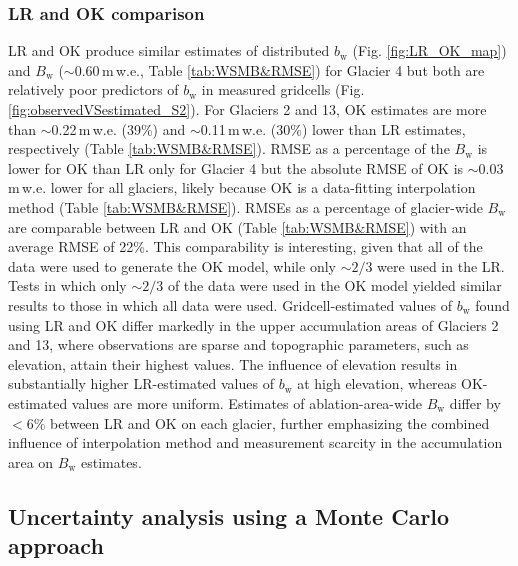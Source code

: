 \documentclass[review,oneside, letterpaper]{igs}
\begin{document}
\subsubsection{LR and OK comparison}
 
LR and OK produce similar estimates of distributed $b_\mathrm{w}$ (Fig. \ref{fig:LR_OK_map}) and $B_\mathrm{w}$ ($\sim$0.60\,m\,w.e., Table \ref{tab:WSMB&RMSE}) for Glacier 4 but both are relatively poor predictors of $b_\mathrm{w}$ in measured gridcells (Fig. \ref{fig:observedVSestimated_S2}). For Glaciers 2 and 13, OK estimates are more than $\sim$0.22\,m\,w.e. (39\%) and $\sim$0.11\,m\,w.e. (30\%) lower than LR estimates, respectively (Table \ref{tab:WSMB&RMSE}). RMSE as a percentage of the $B_\mathrm{w}$ is lower for OK than LR only for Glacier 4 but the absolute RMSE of OK is $\sim$0.03\,m\,w.e. lower for all glaciers, likely because OK is a data-fitting interpolation method (Table \ref{tab:WSMB&RMSE}). RMSEs as a percentage of  glacier-wide $B_\mathrm{w}$ are comparable between LR and OK (Table \ref{tab:WSMB&RMSE}) with an average RMSE of 22\%. This comparability is interesting, given that all of the data were used to generate the OK model, while only $\sim 2/3$ were used in the LR. Tests in which only  $\sim 2/3$ of the data were used in the OK model yielded similar results to those in which all data were used. 
Gridcell-estimated values of $b_\mathrm{w}$ found using LR and OK differ markedly in the upper accumulation areas of Glaciers 2 and 13, where observations are sparse and topographic parameters, such as elevation, attain their highest values. The influence of elevation results in substantially higher LR-estimated values of $b_\mathrm{w}$ at high elevation, whereas OK-estimated values are more uniform. 
Estimates of ablation-area-wide $B_\mathrm{w}$ differ by $<$6\% between LR and OK on each glacier, further emphasizing the combined influence of interpolation method and measurement scarcity in the accumulation area on $B_\mathrm{w}$ estimates.


\subsection{Uncertainty analysis using a Monte Carlo approach}
\end{document}

